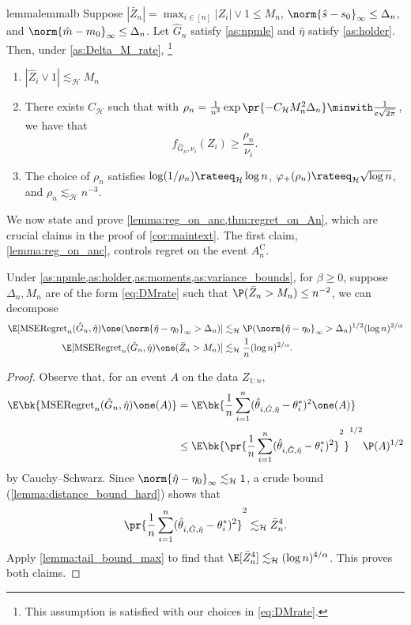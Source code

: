 \documentclass[12pt, reqno]{amsart}
\newcommand{\invphi}{\varphi_{+}}
\newcommand{\Hyperparams}{\mathcal{H}}
\newcommand{\leH}{\lesssim_{\mathcal{H}}}
\newcommand{\hatm}{\hat m}
\newcommand{\hats}{\hat s}
\newcommand{\hateta}{\hat\eta}
\newcommand{\reg}{\mathrm{MSERegret}_n}
\newcommand{\comp}{\mathrm{C}}
\newcommand{\Dinfty}{\norm{\hateta - \eta_0}_{\infty}} %
\numberwithin{equation}{section}
\begin{document}
\begin{refsection}
\begin{appendices}
\begin{restatable}{lemma}{lemmalb}
\label{thm:lb}
Suppose $|\bar Z_n| = \max_{i\in[n]} |Z_i| \vee 1 \le M_n$, $\norm{\hats - s_0}_\infty \le
\Delta_n$, and $\norm{\hatm-m_0}_\infty \le \Delta_n$.
Let $\hat G_n$ satisfy \cref{as:npmle} and $\hateta$ satisfy \cref{as:holder}. Then, under
\cref{as:Delta_M_rate}, \footnote{This assumption is satisfied with our choices in
\eqref{eq:DMrate}.}
\begin{enumerate}
    \item $|\hat Z_i \vee 1| \leH M_n$
    \item There exists $C_\Hyperparams$ such that with $\rho_n = \frac{1}{n^3}\exp
    \pr{-C_
    {\Hyperparams} M_n^2 \Delta_n} \minwith \frac{1}{e\sqrt{2\pi}}$, we have that \[
f_{\hat G_n, \nu_i}(Z_i) \ge \frac{\rho_n}{\nu_i}.
    \]
    \item The choice of $\rho_n$ satisfies $\log (1/\rho_n) \rateeq_{\Hyperparams} \log
    n$,
    $\invphi(\rho_n) \rateeq_{\Hyperparams} \sqrt{\log n}$, and $\rho_n \leH n^{-3}$.
\end{enumerate}
\end{restatable}



We now state and prove \cref{lemma:reg_on_anc,thm:regret_on_An}, which
are crucial claims in the proof of \cref{cor:maintext}. The first claim, 
\cref{lemma:reg_on_anc}, controls regret on the event $A_n^\comp$. 


\begin{lemma}
\label{lemma:reg_on_anc}
Under \cref{as:npmle,as:holder,as:moments,as:variance_bounds}, for $\beta \ge 0$, suppose
$\Delta_n, M_n$ are of the form \eqref{eq:DMrate} such that $\P(\bar Z_n > M_n) \le n^
{-2}$, we can decompose \begin{align*}
\E[\reg(\hat G_n, \hateta) \one(\Dinfty > \Delta_n)] &\leH \P(\Dinfty >
\Delta_n)^{1/2} (\log n)^{2/\alpha} \\
\E[\reg(\hat G_n, \hateta) \one(\bar Z_n > M_n)] &\leH \frac{1}{n} (\log n)^
{2/\alpha}.
\end{align*}
\end{lemma}

\begin{proof}
Observe that, for an event $A$ on the data $Z_{1:n}$, \begin{align*}
\E\bk{\reg(\hat G_n, \hateta)\one(A)} &= \E\bk{\frac{1}{n} \sum_{i=1}^n (\hat\theta_
{i,
\hat
G, \hateta} - \theta_i^*)^2 \one(A)} \\
& \le  \E\bk{\pr{\frac{1}{n} \sum_{i=1}^n (\hat\theta_
{i,
\hat
G, \hateta} - \theta_i^*)^2}^{2}}^{1/2} \P(A)^{1/2}
\end{align*}
by Cauchy--Schwarz. Since $\norm{\hateta -\eta_0}_\infty \leH 1$,  a crude bound
(\cref{lemma:distance_bound_hard}) shows that \[
\pr{\frac{1}{n} \sum_{i=1}^n (\hat\theta_
 {i,
 \hat
 G, \hateta} - \theta_i^*)^2}^{2} \leH \bar Z_n^{4}.
\]
Apply \cref{lemma:tail_bound_max} to find that $\E[\bar Z_n^4] \leH (\log n)^{4/\alpha}$.
This proves both claims.
\end{proof}



\end{appendices}
\end{refsection}
\end{document}
